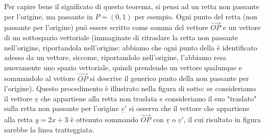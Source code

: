 \begin{remark}
  Per capire bene il significato di questo teorema, si pensi ad un retta non passante per l'origine, ma passante in $P = (0, 1)$ per esempio. Ogni punto del retta (non passante per l'origine) può essere scritto come somma del vettore $\vec{OP}$ e un vettore di un sottospazio vettoriale (immaginate di ritraslare la retta non passante nell'origine, riportandola nell'origine: abbiamo che ogni punto della è identificato adesso da un vettore, siccome, riportandolo nell'origine, l'abbiamo resa nuovamente uno spazio vettoriale, quindi prendendo un vettore qualunque e sommandolo al vettore $\vec{OP}$ si descrive il generico punto della non passante per l'origine). Questo procedimento è illustrato nella figura di sotto: se consideriamo il vettore $\underline{v}$ che appartiene alla retta non traslata e consideriamo il suo "traslato" sulla retta non passante per l'origine $\underline{v}'$ si osserva che il vettore che appartiene alla retta $y=2x+3$ è ottenuto sommando $\vec{OP}$ con $\underline{v}$ o $\underline{v}'$, il cui risultato in figura sarebbe la linea tratteggiata. 
  
  \begin{figure}[H]
    \centering
  \end{figure}
\end{remark}

